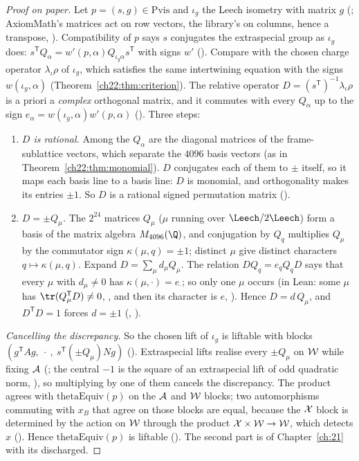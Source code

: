 \begin{proof}[Proof on paper]
Let $p=(s,g)\in\mathrm{Pvis}$ and $\iota_g$ the Leech isometry with matrix $g$ (; AxiomMath's
matrices act on row vectors, the library's on columns, hence a transpose, ).  Compatibility of
$p$ says $s$ conjugates the extraspecial group as $\iota_g$ does: $s^{\mathsf T}Q_\alpha=w'(p,\alpha)Q_{\iota_g\alpha}s^{\mathsf T}$ with
signs $w'$ ().  Compare with the chosen charge operator $\lambda_\iota\rho$ of $\iota_g$, which satisfies the same intertwining
equation with the signs $w(\iota_g,\alpha)$ (Theorem~\ref{ch22:thm:criterion}).  The relative operator
$D=(s^{\mathsf T})^{-1}\lambda_\iota\rho$ is a priori a \emph{complex} orthogonal matrix, and it commutes with every $Q_\alpha$
up to the sign $e_\alpha=w(\iota_g,\alpha)w'(p,\alpha)$ ().  Three steps:
\begin{enumerate}[label=(\roman*)]
\item \emph{$D$ is rational.}  Among the $Q_\alpha$ are the diagonal matrices of the frame-sublattice vectors, which separate
  the $4096$ basis vectors (as in Theorem~\ref{ch22:thm:monomial}).  $D$ conjugates each of them to $\pm$ itself, so it maps
  each basis line to a basis line: $D$ is monomial, and orthogonality makes its entries $\pm1$.  So $D$ is a rational signed
  permutation matrix ().
\item \emph{$D=\pm Q_\mu$.}  The $2^{24}$ matrices $Q_\mu$ ($\mu$ running over $\Leech/2\Leech$) form a basis of the
  matrix algebra $M_{4096}(\Q)$, and conjugation by $Q_q$ multiplies $Q_\mu$ by the commutator sign $\kappa(\mu,q)=\pm1$;
  distinct $\mu$ give distinct characters $q\mapsto\kappa(\mu,q)$.  Expand $D=\sum_\mu d_\mu Q_\mu$.  The relation
  $DQ_q=e_qQ_qD$ says that every $\mu$ with $d_\mu\ne0$ has $\kappa(\mu,\cdot)=e_\cdot$; so only one $\mu$ occurs (in Lean:
  some $\mu$ has $\tr(Q_\mu^{\mathsf T}D)\ne0$, , and then its character is $e$,
  ).  Hence $D=d\,Q_\mu$, and $D^{\mathsf T}D=1$ forces $d=\pm1$ (,
  ).
\end{enumerate}
\emph{Cancelling the discrepancy.}  So the chosen lift of $\iota_g$ is liftable with blocks
$(g^{\mathsf T}Ag,\ \cdot\ ,\ s^{\mathsf T}(\pm Q_\mu)Ng)$ ().  Extraspecial lifts realise every
$\pm Q_\mu$ on $\mathcal{W}$ while fixing $\mathcal{A}$ (; the central $-1$ is the square of an
extraspecial lift of odd quadratic norm, ), so multiplying by one of them cancels the discrepancy.
The product agrees with $\mathrm{thetaEquiv}(p)$ on the $\mathcal{A}$ and $\mathcal{W}$ blocks; two automorphisms
commuting with $x_B$ that agree on those blocks are equal, because the $\mathcal{X}$ block is determined by the action on
$\mathcal{W}$ through the product $\mathcal{X}\times\mathcal{W}\to\mathcal{W}$, which detects $x$
().  Hence $\mathrm{thetaEquiv}(p)$ is liftable ().  The second part is
 of Chapter~\ref{ch:21} with its  discharged.
\end{proof}

